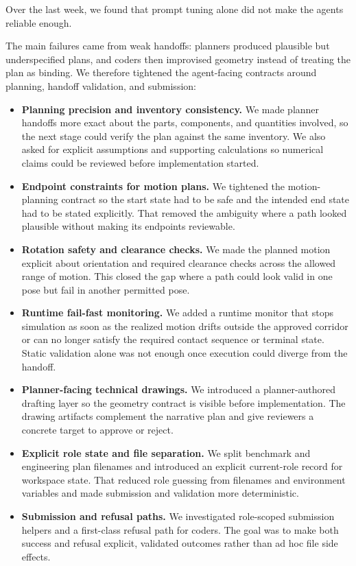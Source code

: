 \documentclass[conference]{IEEEtran}
\begin{document}
Over the last week, we found that prompt tuning alone did not make the agents reliable enough.

The main failures came from weak handoffs: planners produced plausible but underspecified plans, and coders then improvised geometry instead of treating the plan as binding. We therefore tightened the agent-facing contracts around planning, handoff validation, and submission:
\begin{itemize}
    \item \textbf{Planning precision and inventory consistency.} We made planner handoffs more exact about the parts, components, and quantities involved, so the next stage could verify the plan against the same inventory. We also asked for explicit assumptions and supporting calculations so numerical claims could be reviewed before implementation started.
    \item \textbf{Endpoint constraints for motion plans.} We tightened the motion-planning contract so the start state had to be safe and the intended end state had to be stated explicitly. That removed the ambiguity where a path looked plausible without making its endpoints reviewable.
    \item \textbf{Rotation safety and clearance checks.} We made the planned motion explicit about orientation and required clearance checks across the allowed range of motion. This closed the gap where a path could look valid in one pose but fail in another permitted pose.
    \item \textbf{Runtime fail-fast monitoring.} We added a runtime monitor that stops simulation as soon as the realized motion drifts outside the approved corridor or can no longer satisfy the required contact sequence or terminal state. Static validation alone was not enough once execution could diverge from the handoff.
    \item \textbf{Planner-facing technical drawings.} We introduced a planner-authored drafting layer so the geometry contract is visible before implementation. The drawing artifacts complement the narrative plan and give reviewers a concrete target to approve or reject.
    \item \textbf{Explicit role state and file separation.} We split benchmark and engineering plan filenames and introduced an explicit current-role record for workspace state. That reduced role guessing from filenames and environment variables and made submission and validation more deterministic.
    \item \textbf{Submission and refusal paths.} We investigated role-scoped submission helpers and a first-class refusal path for coders. The goal was to make both success and refusal explicit, validated outcomes rather than ad hoc file side effects.
\end{itemize}
\end{document}
